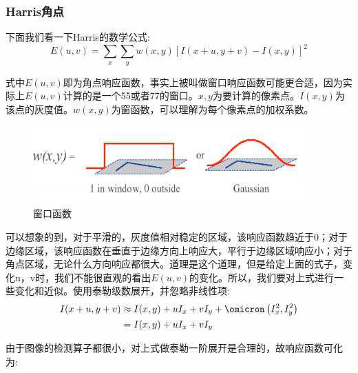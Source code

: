 \subsubsection{Harris角点\cite{harris1988combined}}
下面我们看一下Harris的数学公式:
\begin{equation}
E(u,v)=\sum_{x}\sum_{y} w(x,y)[I(x+u,y+v)-I(x,y)]^{2}\label{Harris}
\end{equation}\par
式中$E(u,v)$即为角点响应函数，事实上被叫做窗口响应函数可能更合适，因为实际上$E(u,v)$计算的是一个5\times5或者7\times7的窗口。$x,y$为要计算的像素点。$I(x,y)$为该点的灰度值。$w(x,y)$为窗函数，可以理解为每个像素点的加权系数。
\begin{figure}[htbp]
	\centering
	\includegraphics[height=3cm]{figures/Harris2.png}
	\caption{窗口函数}
\end{figure}
可以想象的到，对于平滑的，灰度值相对稳定的区域，该响应函数趋近于0；对于边缘区域，该响应函数在垂直于边缘方向上响应大，平行于边缘区域响应小；对于角点区域，无论什么方向响应都很大。道理是这个道理，但是给定上面的式子，变化u，v时，我们不能很直观的看出$E(u,v)$的变化。所以，我们要对上式进行一些变化和近似。使用泰勒级数展开，并忽略非线性项:
\begin{equation}
\begin{aligned}
I(x+u, y+v) &\approx I(x, y)+u I_{x}+v I_{y}+\omicron\left(I_x^{2},I_y^{2}\right)\\
&=I(x, y)+u I_{x}+v I_{y}
\end{aligned}
\end{equation}\par
由于图像的检测算子都很小，对上式做泰勒一阶展开是合理的，故响应函数可化为:
